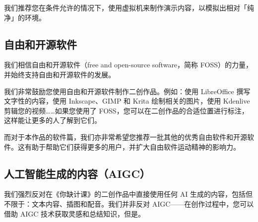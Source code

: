 我们推荐您在条件允许的情况下，使用虚拟机来制作演示内容，以模拟出相对「纯净」的环境。

\subsection{自由和开源软件}

我们相信自由和开源软件（free and open-source software，简称 FOSS）的力量，并始终支持自由和开源软件的发展。

我们非常鼓励您使用自由和开源软件制作二创作品。例如：使用 LibreOffice 撰写文字性的内容，使用 Inkscape、GIMP 和 Krita 绘制相关的图片，使用 Kdenlive 剪辑您的视频……如果您使用了 FOSS，您可以在二创作品的合适位置进行标注，这样能让更多的人了解到它们。

而对于本作品的软件篇，我们亦非常希望您推荐一批其他的优秀自由软件和开源软件。这有助于帮助它们获得更多的用户，并扩大自由软件运动精神的影响力。

\subsection{人工智能生成的内容（AIGC）}

我们强烈反对在《你缺计课》的二创作品中直接使用任何 AI 生成的内容，包括但不限于：文本内容、插图和配音。我们并非反对 AIGC——在创作过程中，您可以借助 AIGC 技术获取灵感和总结知识，但是。